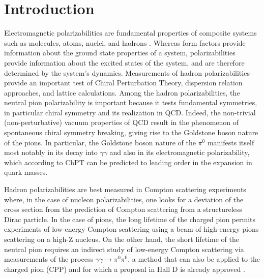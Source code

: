 \section{Introduction}

Electromagnetic polarizabilities are fundamental properties of
composite systems such as molecules, atoms, nuclei, and hadrons
\cite{Holstein:1990qy}. Whereas form factors provide information
about the ground state properties of a system, polarizabilities
provide information about the excited states of the system, and are
  therefore determined by the system's dynamics.
Measurements of hadron polarizabilities provide an important test
of Chiral Perturbation Theory, dispersion relation approaches,
and lattice calculations. Among the hadron polarizabilities, the
neutral pion polarizability is important because it
tests fundamental symmetries, in particular chiral symmetry and its
realization in QCD.  Indeed, the non-trivial (non-perturbative) vacuum
properties of QCD result in the phenomenon of spontaneous chiral
symmetry breaking, giving rise to the Goldstone boson nature of the
pions.  In particular, the Goldstone boson nature of the $\pi^0$
manifests itself most notably in its decay into $\gamma\gamma$ and
also in its electromagnetic polarizability, which according to ChPT
can be predicted to leading order in the expansion in quark
masses.


Hadron polarizabilities are best measured in Compton scattering
experiments where, in the case of nucleon polarizabilities, one looks
for a deviation of the cross section from the prediction of Compton
scattering from a structureless Dirac particle.
In the case of pions, the long lifetime of the charged pion permits
experiments of low-energy Compton scattering using a beam of high-energy pions scattering on a high-Z nucleus. On the other hand, the
short lifetime of the neutral pion requires an indirect study of low-energy Compton scattering via measurements of the process $\gamma
\gamma \rightarrow \pi^0 \pi^0$, a method that can also be applied to
the charged pion (CPP) and for which a proposal in Hall D is already
approved \cite{CPPexp}.

